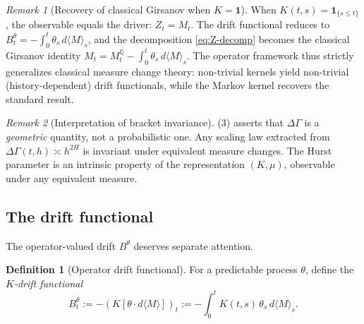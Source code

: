 \documentclass[11pt]{article}
\theoremstyle{plain}
\theoremstyle{definition}
\newtheorem{definition}{Definition}[section]
\theoremstyle{remark}
\newtheorem{remark}{Remark}[section]
\newcommand{\QQ}{\mathbb{Q}}
\newcommand{\dGamma}{\Delta\Gamma}
\newcommand{\bracket}[1]{\langle #1 \rangle}
\begin{document}
\begin{remark}[Recovery of classical Girsanov when $K = \mathbf{1}$]\label{rem:classical-recovery}
When $K(t,s) = \mathbf{1}_{\{s \le t\}}$, the observable equals the driver:
$Z_t = M_t$. The drift functional reduces to
$B_t^\theta = -\int_0^t \theta_s\,d\bracket{M}_s$, and the decomposition
\eqref{eq:Z-decomp} becomes the classical Girsanov identity
$M_t = M_t^{\QQ} - \int_0^t \theta_s\,d\bracket{M}_s$. The operator framework
thus strictly generalizes classical measure change theory: non-trivial kernels
yield non-trivial (history-dependent) drift functionals, while the Markov
kernel recovers the standard result.
\end{remark}

\begin{remark}[Interpretation of bracket invariance]
(3) asserts that $\dGamma$ is a \emph{geometric}
quantity, not a probabilistic one. Any scaling law extracted from
$\dGamma(t,h) \asymp h^{2H}$ is invariant under equivalent measure changes.
The Hurst parameter is an intrinsic property of the representation $(K, \mu)$,
observable under any equivalent measure.
\end{remark}

\subsection{The drift functional}

The operator-valued drift $B^\theta$ deserves separate attention.

\begin{definition}[Operator drift functional]\label{def:drift-functional}
For a predictable process $\theta$, define the \emph{$K$-drift functional}
\begin{equation}\label{eq:drift-functional}
B_t^\theta := -(K[\theta \cdot d\bracket{M}])_t := -\int_0^t K(t,s)\,\theta_s\,d\bracket{M}_s.
\end{equation}
\end{definition}
\end{document}
